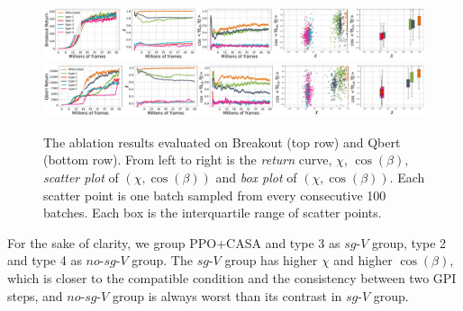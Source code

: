 \begin{figure}[t!]
\centering
% 
% 
% 
\includegraphics[width=1.0\linewidth]{body/intro_fig/new_ab_Breakout.pdf}
\includegraphics[width=1.0\linewidth]{body/intro_fig/new_ab_Qbert.pdf}
\caption{The ablation results evaluated on Breakout (top row) and Qbert (bottom row). From left to right is the \emph{return} curve, $\chi$, $\cos(\beta)$, \emph{scatter plot} of $(\chi, \cos(\beta))$ and \emph{box plot} of $(\chi, \cos(\beta))$. Each scatter point is one batch sampled from every consecutive 100 batches. Each box is the interquartile range of scatter points.
}
\label{fig:ablation}
\end{figure}

For the sake of clarity, we group PPO+CASA and type 3 as $sg\text{-}V$ group, type 2 and type 4 as $no\text{-}sg\text{-}V$ group. 
{ The $sg\text{-}V$ group has higher $\chi$ and higher $\cos(\beta)$, which is closer to the compatible condition and the consistency between two GPI steps,} 
and $no\text{-}sg\text{-}V$ group is always worst than its contrast in $sg\text{-}V$ group. 

